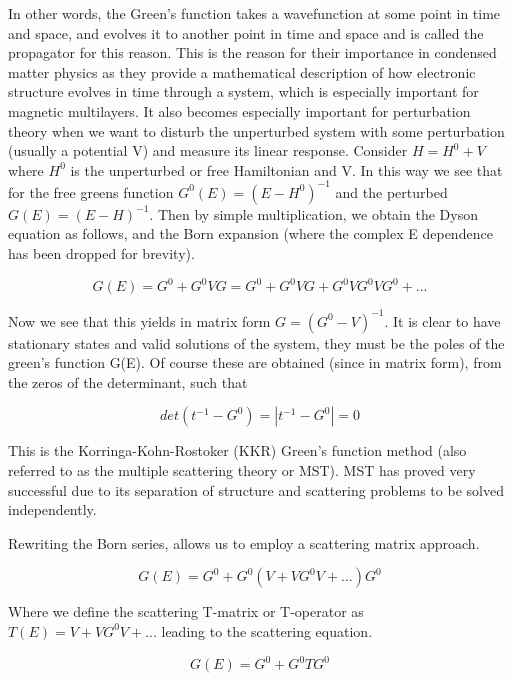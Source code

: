 \documentclass[12pt]{article}
\begin{document}
In other words, the Green's function takes a wavefunction at some point in time and space, and evolves it to another point in time and space and is called the propagator for this reason. This is the reason for their importance in condensed matter physics as they provide a mathematical description of how electronic structure evolves in time through a system, which is especially important for magnetic multilayers. It also becomes especially important for perturbation theory when we want to disturb the unperturbed system with some perturbation (usually a potential V) and measure its linear response. Consider $H=H^0+V$ where $H^0$ is the unperturbed or free Hamiltonian and V. In this way we see that for the free greens function $G^0(E)=(E-H^0)^{-1}$ and the perturbed $G(E)=(E-H)^{-1}$. Then by simple multiplication, we obtain the Dyson equation as follows, and the Born expansion (where the complex E dependence has been dropped for brevity).

\begin{equation} \label{4.1} \tag{4.4}
G(E)=G^0+G^0VG=G^0+G^0VG+G^0VG^0VG^0+...
\end{equation}

Now we see that this yields in matrix form $G=(G^0-V)^{-1}$. It is clear to have stationary states and valid solutions of the system, they must be the poles of the green's function G(E). Of course these are obtained (since in matrix form), from the zeros of the determinant, such that

\begin{equation} \label{4.1} \tag{4.5}
det(t^{-1}-G^0)=|t^{-1}-G^0|=0
\end{equation}

This is the Korringa-Kohn-Rostoker (KKR) Green's function method (also referred to as the multiple scattering theory or MST). MST has proved very successful due to its separation of structure and scattering problems to be solved independently. 

Rewriting the Born series, allows us to employ a scattering matrix approach. 

\begin{equation} \label{4.1} \tag{4.6}
G(E)=G^0+G^0(V+VG^0V+...)G^0
\end{equation}

Where we define the scattering T-matrix or T-operator as $T(E)= V+VG^0V+...$ leading to the scattering equation.

\begin{equation} \label{4.1} \tag{4.7}
G(E)=G^0+G^0TG^0
\end{equation}
\end{document}
